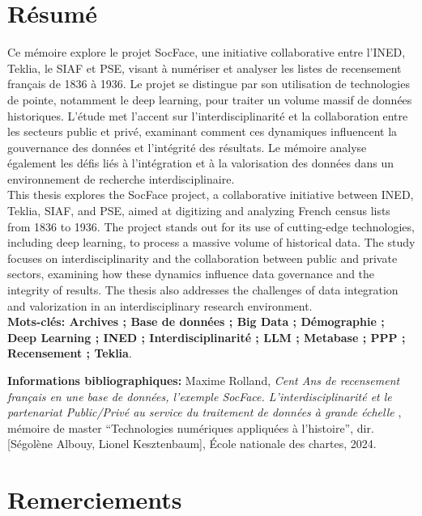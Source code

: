 \documentclass[a4paper,12pt,twoside]{book}
\begin{document}
	\chapter{Résumé}
\medskip
	Ce mémoire explore le projet SocFace, une initiative collaborative entre l'INED, Teklia, le SIAF et PSE, visant à numériser et analyser les listes de recensement français de 1836 à 1936. Le projet se distingue par son utilisation de technologies de pointe, notamment le deep learning, pour traiter un volume massif de données historiques. L'étude met l'accent sur l'interdisciplinarité et la collaboration entre les secteurs public et privé, examinant comment ces dynamiques influencent la gouvernance des données et l'intégrité des résultats. Le mémoire analyse également les défis liés à l'intégration et à la valorisation des données dans un environnement de recherche interdisciplinaire.\\

    This thesis explores the SocFace project, a collaborative initiative between INED, Teklia, SIAF, and PSE, aimed at digitizing and analyzing French census lists from 1836 to 1936. The project stands out for its use of cutting-edge technologies, including deep learning, to process a massive volume of historical data. The study focuses on interdisciplinarity and the collaboration between public and private sectors, examining how these dynamics influence data governance and the integrity of results. The thesis also addresses the challenges of data integration and valorization in an interdisciplinary research environment.\\
	
	\textbf{Mots-clés: Archives ; Base de données ; Big Data ; Démographie ; Deep Learning ; INED ; Interdisciplinarité ; LLM ; Metabase ; PPP ; Recensement ; Teklia}.
	
	\textbf{Informations bibliographiques:} Maxime Rolland, \textit{ Cent Ans de recensement français en une base de données, l’exemple SocFace. L’interdisciplinarité et le partenariat Public/Privé au service du traitement de données à grande échelle }, mémoire de master \enquote{Technologies numériques appliquées à l'histoire}, dir. [Ségolène Albouy, Lionel Kesztenbaum], École nationale des chartes, 2024.
	
		\newpage{\pagestyle{empty}\cleardoublepage}
	
	\newpage{\pagestyle{empty}\cleardoublepage}
	
	\chapter{Remerciements}
	
\end{document}
